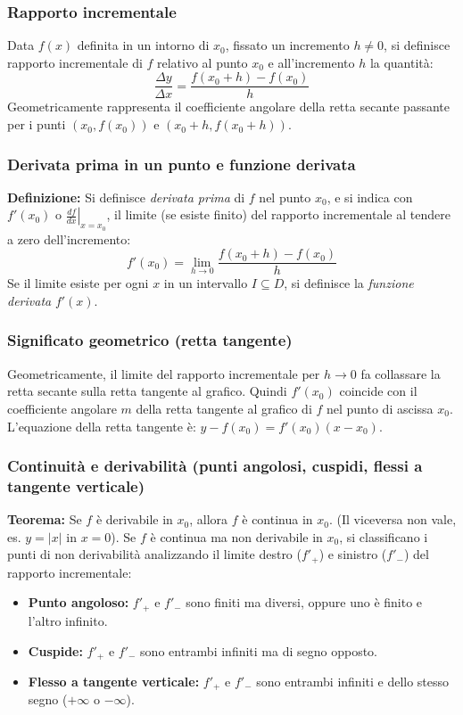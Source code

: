 \subsubsection{Rapporto incrementale}
Data $f(x)$ definita in un intorno di $x_0$, fissato un incremento $h \neq 0$, si definisce rapporto incrementale di $f$ relativo al punto $x_0$ e all'incremento $h$ la quantità:
\[ \frac{\Delta y}{\Delta x} = \frac{f(x_0 + h) - f(x_0)}{h} \]
Geometricamente rappresenta il coefficiente angolare della retta secante passante per i punti $(x_0, f(x_0))$ e $(x_0+h, f(x_0+h))$.

\subsubsection{Derivata prima in un punto e funzione derivata}
\textbf{Definizione:} Si definisce \textit{derivata prima} di $f$ nel punto $x_0$, e si indica con $f'(x_0)$ o $\left.\frac{df}{dx}\right|_{x=x_0}$, il limite (se esiste finito) del rapporto incrementale al tendere a zero dell'incremento:
\[ f'(x_0) = \lim_{h \to 0} \frac{f(x_0 + h) - f(x_0)}{h} \]
Se il limite esiste per ogni $x$ in un intervallo $I \subseteq D$, si definisce la \textit{funzione derivata} $f'(x)$.

\subsubsection{Significato geometrico (retta tangente)}
Geometricamente, il limite del rapporto incrementale per $h \to 0$ fa collassare la retta secante sulla retta tangente al grafico. Quindi $f'(x_0)$ coincide con il coefficiente angolare $m$ della retta tangente al grafico di $f$ nel punto di ascissa $x_0$. 
L'equazione della retta tangente è: $y - f(x_0) = f'(x_0)(x - x_0)$.

\subsubsection{Continuità e derivabilità (punti angolosi, cuspidi, flessi a tangente verticale)}
\textbf{Teorema:} Se $f$ è derivabile in $x_0$, allora $f$ è continua in $x_0$. (Il viceversa non vale, es. $y=|x|$ in $x=0$).
Se $f$ è continua ma non derivabile in $x_0$, si classificano i punti di non derivabilità analizzando il limite destro ($f'_+$) e sinistro ($f'_-$) del rapporto incrementale:
\begin{itemize}
    \item \textbf{Punto angoloso:} $f'_+$ e $f'_-$ sono finiti ma diversi, oppure uno è finito e l'altro infinito.
    \item \textbf{Cuspide:} $f'_+$ e $f'_-$ sono entrambi infiniti ma di segno opposto.
    \item \textbf{Flesso a tangente verticale:} $f'_+$ e $f'_-$ sono entrambi infiniti e dello stesso segno ($+\infty$ o $-\infty$).
\end{itemize}

